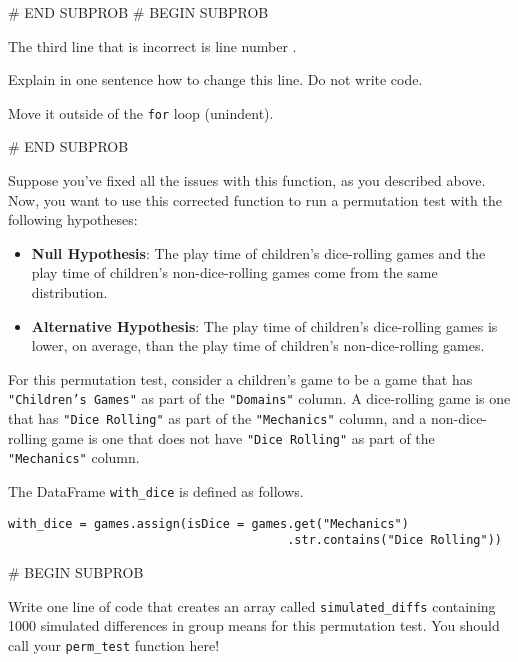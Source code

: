 \documentclass[twoside,12pt]{article}
\begin{document}
{# END SUBPROB
            # BEGIN SUBPROB

    
                The third line that is incorrect is line number .
            
                Explain in one sentence how to change this line. Do not write code.
                \begin{responsebox}{1.5in}
                    Move it outside of the \texttt{for} loop (unindent).
                \end{responsebox}
            

# END SUBPROB
            

\newpage 

        Suppose you've fixed all the issues with this function, as you described above. Now, you want to use this corrected function to run a permutation test with the following hypotheses:

        \begin{itemize}
            \item \textbf{Null Hypothesis}: The play time of children's dice-rolling games and the play time of children's non-dice-rolling games come from the same distribution.
            \item \textbf{Alternative Hypothesis}: The play time of children's dice-rolling games is lower, on average, than the play time of children's non-dice-rolling games.
        \end{itemize}
        
        
        For this permutation test, consider a children's game to be a game that has \texttt{"Children's Games"} as part of the \texttt{"Domains"} column. A dice-rolling game is one that has \texttt{"Dice Rolling"} as part of the \texttt{"Mechanics"} column, and a non-dice-rolling game is one that does not have \texttt{"Dice Rolling"} as part of the \texttt{"Mechanics"} column.
        
        The DataFrame \texttt{with\_dice} is defined as follows.  

\begin{verbatim}
with_dice = games.assign(isDice = games.get("Mechanics")
                                       .str.contains("Dice Rolling"))
\end{verbatim}
    
    
    # BEGIN SUBPROB


        Write one line of code that creates an array called \texttt{simulated\_diffs} containing 1000 simulated differences in group means for this permutation test. You should call your \texttt{perm\_test} function here!

}
\end{document}
